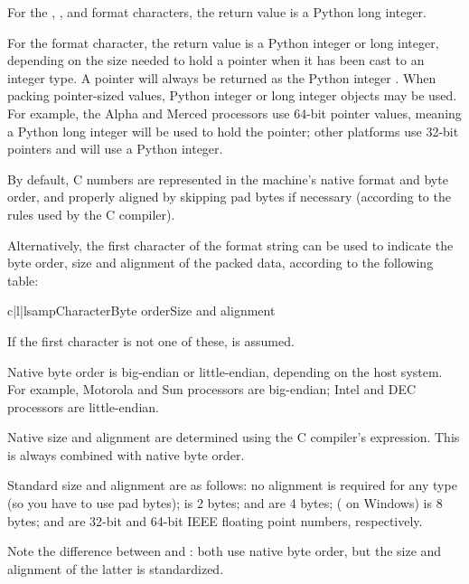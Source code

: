 For the , ,  and 
format characters, the return value is a Python long integer.

For the  format character, the return value is a Python
integer or long integer, depending on the size needed to hold a
pointer when it has been cast to an integer type.  A \NULL{} pointer will
always be returned as the Python integer . When packing pointer-sized
values, Python integer or long integer objects may be used.  For
example, the Alpha and Merced processors use 64-bit pointer values,
meaning a Python long integer will be used to hold the pointer; other
platforms use 32-bit pointers and will use a Python integer.

By default, C numbers are represented in the machine's native format
and byte order, and properly aligned by skipping pad bytes if
necessary (according to the rules used by the C compiler).

Alternatively, the first character of the format string can be used to
indicate the byte order, size and alignment of the packed data,
according to the following table:

\begin{tableiii}{c|l|l}{samp}{Character}{Byte order}{Size and alignment}
\end{tableiii}

If the first character is not one of these,  is assumed.

Native byte order is big-endian or little-endian, depending on the
host system.  For example, Motorola and Sun processors are big-endian;
Intel and DEC processors are little-endian.

Native size and alignment are determined using the C compiler's
 expression.  This is always combined with native byte
order.

Standard size and alignment are as follows: no alignment is required
for any type (so you have to use pad bytes);
 is 2 bytes;
 and  are 4 bytes;
 ( on Windows) is 8 bytes;
 and  are 32-bit and 64-bit
IEEE floating point numbers, respectively.

Note the difference between  and \character{=}: both use
native byte order, but the size and alignment of the latter is
standardized.

